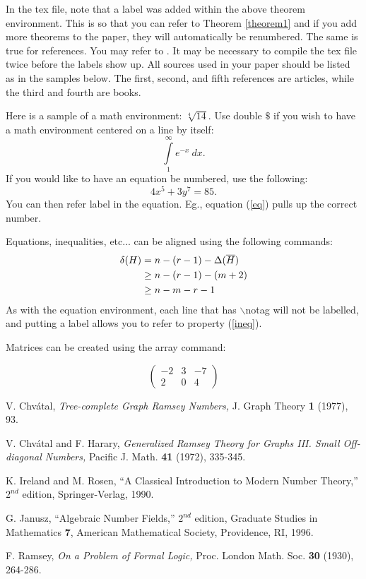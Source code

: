\documentclass[10pt]{amsart}
\begin{document}
In the tex file, note that a label was added within the above theorem environment.  This is so that you can refer to Theorem \ref{theorem1} and if you add more theorems to the paper, they will automatically be renumbered.  The same is true for references.  You may refer to \cite{R}.  It may be necessary to compile the tex file twice before the labels show up.  All sources used in your paper should be listed as in the samples below.  The first, second, and fifth references are articles, while the third and fourth are books.

Here is a sample of a math environment: $\sqrt[4]{14}$.  Use double $\$$ if you wish to have a math environment centered on a line by itself:
$$\mathop{\int}\limits_{1}^{\infty} e^{-x} \ dx.$$
If you would like to have an equation be numbered, use the following:
\begin{equation}  4x^5+3y^7=85. \label{eq} \end{equation}
You can then refer label in the equation.  Eg., equation (\ref{eq}) pulls up the correct number.

Equations, inequalities, etc... can be aligned using the following commands:
\begin{align} \delta (H) &= n-(r-1)-\Delta (\overline{H}) \notag \\
                                    &\ge n-(r-1)-(m+2) \notag \\
                                    &\ge n-m-r-1 \label{ineq} \end{align}
As with the equation environment, each line that has $\backslash$notag will not be labelled, and putting a label allows you to refer to property (\ref{ineq}).

Matrices can be created using the array command:

$$\left( \begin{array}{rrr} -2 & 3 & -7 \\ 2 & 0 & 4 \end{array} \right)$$


\begin{thebibliography}{10}

 V. Chv\'atal, {\it Tree-complete Graph Ramsey Numbers,}  J. Graph Theory {\bf 1} (1977), 93.

 V. Chv\'atal and F. Harary, {\it Generalized Ramsey Theory for Graphs III. Small Off-diagonal Numbers,} Pacific J. Math. {\bf 41} (1972), 335-345.

 K. Ireland and M. Rosen, ``A Classical
Introduction to Modern Number Theory,'' $2^{nd}$ edition,
Springer-Verlag, 1990.

 G. Janusz, ``Algebraic Number Fields,'' $2^{nd}$ edition, Graduate Studies in Mathematics {\bf 7}, American Mathematical Society, Providence, RI, 1996.

 F. Ramsey, {\it On a Problem of Formal Logic,} Proc. London Math. Soc. {\bf 30} (1930), 264-286.



\end{thebibliography}
\end{document}
